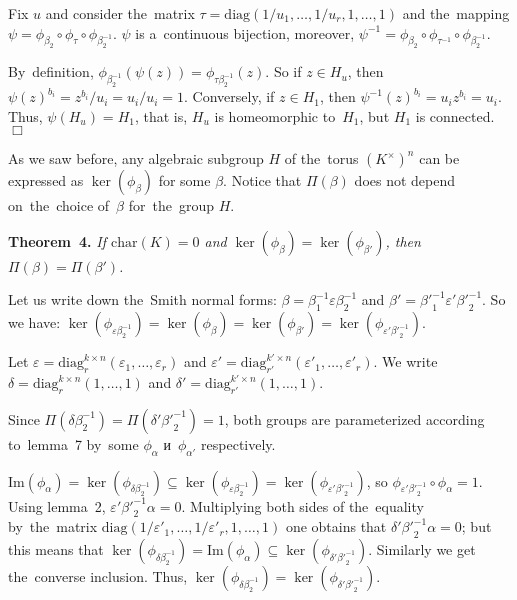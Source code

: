 \documentclass[twoside]{article}
\begin{document}
    Fix $u$ and consider the~matrix $\tau = \mathrm{diag}(1 / u_1, \ldots, 1 / u_r, 1, \ldots, 1)$
    and the~mapping $\psi = \phi_{\beta_2} \circ \phi_\tau \circ \phi_{\beta_2^{-1}}$.
    $\psi$ is a~continuous bijection, moreover, $\psi^{-1} = \phi_{\beta_2} \circ \phi_{\tau^{-1}} \circ \phi_{\beta_2^{-1}}$.

    By~definition, $\phi_{\beta_2^{-1}}(\psi(z)) = \phi_{\tau \beta_2^{-1}}(z)$. So if $z \in H_u$,
    then $\psi(z)^{b_i} = z^{b_i} / u_i = u_i / u_i = 1$. Conversely, if $z \in H_1$, then $\psi^{-1}(z)^{b_i} = u_i z^{b_i} = u_i$.
    Thus, $\psi(H_u) = H_1$, that is, $H_u$ is homeomorphic to~$H_1$, but $H_1$ is connected.
\hfill$\Box$\medskip

As we saw before, any algebraic subgroup $H$ of the~torus $(K^\times)^n$ can be expressed as $\ker(\phi_\beta)$
for some $\beta$. Notice that $\Pi(\beta)$ does not depend on~the~choice of~$\beta$ for~the~group $H$.

\medskip\noindent\textbf{Theorem~4.}\emph{
    If $\mathrm{char}(K) = 0$ and $\ker(\phi_{\beta}) = \ker(\phi_{\beta'})$, then $\Pi(\beta) = \Pi(\beta')$.
}\medskip

    Let us write down the~Smith normal forms: $\beta = \beta_1^{-1} \varepsilon \beta_2^{-1}$
    and $\beta' = {\beta'}_1^{-1} \varepsilon' {\beta'}_2^{-1}$. So we have: $\ker(\phi_{\varepsilon \beta_2^{-1}}) = \ker(\phi_{\beta}) = \ker(\phi_{\beta'}) = \ker(\phi_{\varepsilon' {\beta'}_2^{-1}})$.

    Let $\varepsilon = \mathrm{diag}^{k \times n}_r(\varepsilon_1, \ldots, \varepsilon_r)$
    and $\varepsilon' = \mathrm{diag}^{k' \times n}_{r'}(\varepsilon'_1, \ldots, \varepsilon'_r)$.
    We write $\delta = \mathrm{diag}^{k \times n}_r(1, \ldots, 1)$ and $\delta' = \mathrm{diag}^{k' \times n}_{r'}(1, \ldots, 1)$.

    Since $\Pi(\delta \beta_2^{-1}) = \Pi(\delta' {\beta'}_2^{-1}) = 1$, both groups are parameterized
    according to~lemma~7 by~some $\phi_\alpha$ и~$\phi_{\alpha'}$ respectively.

    $\mathrm{Im}(\phi_\alpha) = \ker(\phi_{\delta \beta_2^{-1}}) \subseteq \ker(\phi_{\varepsilon \beta_2^{-1}}) = \ker(\phi_{\varepsilon' {\beta'}_2^{-1}})$,
    so $\phi_{\varepsilon' {\beta'}_2^{-1}} \circ \phi_\alpha = 1$. Using lemma~2, $\varepsilon' {\beta'}_2^{-1} \alpha = 0$.
    Multiplying both sides of the~equality by~the~matrix $\mathrm{diag}(1 / \varepsilon'_1, \ldots, 1 / \varepsilon'_r, 1, \ldots, 1)$
    one obtains that $\delta' {\beta'}_2^{-1} \alpha = 0$; but this means that $\ker(\phi_{\delta \beta_2^{-1}}) = \mathrm{Im}(\phi_\alpha) \subseteq \ker(\phi_{\delta' {\beta'}_2^{-1}})$.
    Similarly we get the~converse inclusion. Thus, $\ker(\phi_{\delta \beta_2^{-1}}) = \ker(\phi_{\delta' {\beta'}_2^{-1}})$.
\end{document}
